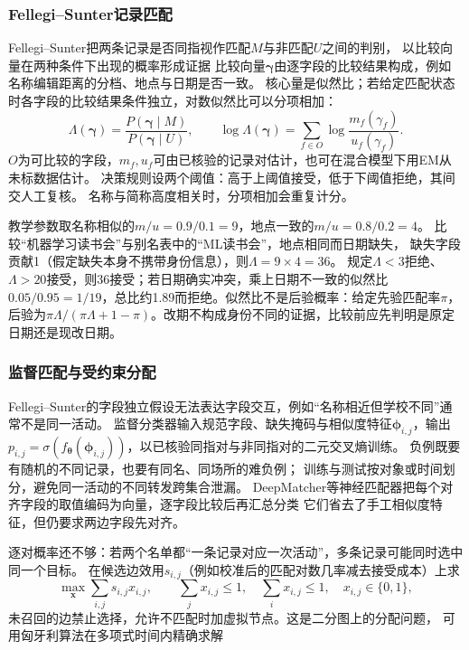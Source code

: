 \subsubsection{Fellegi--Sunter记录匹配}
\label{sec:nlp-extraction-fellegi-sunter}

Fellegi--Sunter把两条记录是否同指视作匹配$M$与非匹配$U$之间的判别，
以比较向量在两种条件下出现的概率形成证据
比较向量$\bm{\gamma}$由逐字段的比较结果构成，例如名称编辑距离的分档、地点与日期是否一致。
核心量是似然比；若给定匹配状态时各字段的比较结果条件独立，对数似然比可以分项相加：
\begin{equation}
  \Lambda(\bm{\gamma})=
  \frac{P(\bm{\gamma}\mid M)}{P(\bm{\gamma}\mid U)},
  \qquad
  \log\Lambda(\bm{\gamma})
    =\sum_{f\in O}
       \log\frac{m_f(\gamma_f)}{u_f(\gamma_f)}.
  \label{eq:nlp-extraction-fellegi}
\end{equation}
$O$为可比较的字段，$m_f,u_f$可由已核验的记录对估计，也可在混合模型下用EM从未标数据估计。
决策规则设两个阈值：高于上阈值接受，低于下阈值拒绝，其间交人工复核。
名称与简称高度相关时，分项相加会重复计分。

教学参数取名称相似的$m/u=0.9/0.1=9$，地点一致的$m/u=0.8/0.2=4$。
比较“机器学习读书会”与别名表中的“ML读书会”，地点相同而日期缺失，
缺失字段贡献1（假定缺失本身不携带身份信息），则$\Lambda=9\times4=36$。
规定$\Lambda<3$拒绝、$\Lambda>20$接受，则36接受；若日期确实冲突，乘上日期不一致的似然比
$0.05/0.95=1/19$，总比约1.89而拒绝。似然比不是后验概率：给定先验匹配率$\pi$，
后验为$\pi\Lambda/(\pi\Lambda+1-\pi)$。改期不构成身份不同的证据，比较前应先判明是原定日期还是现改日期。

\subsubsection{监督匹配与受约束分配}
\label{sec:nlp-extraction-supervised-matching}

Fellegi--Sunter的字段独立假设无法表达字段交互，例如“名称相近但学校不同”通常不是同一活动。
监督分类器输入规范字段、缺失掩码与相似度特征$\bm{\phi}_{i,j}$，输出
$p_{i,j}=\sigma(f_{\bm{\theta}}(\bm{\phi}_{i,j}))$，以已核验同指对与非同指对的二元交叉熵训练。
负例既要有随机的不同记录，也要有同名、同场所的难负例；
训练与测试按对象或时间划分，避免同一活动的不同转发跨集合泄漏。
DeepMatcher等神经匹配器把每个对齐字段的取值编码为向量，逐字段比较后再汇总分类
它们省去了手工相似度特征，但仍要求两边字段先对齐。

逐对概率还不够：若两个名单都“一条记录对应一次活动”，多条记录可能同时选中同一个目标。
在候选边效用$s_{i,j}$（例如校准后的匹配对数几率减去接受成本）上求
\begin{equation}
  \max_{\bm{x}}\sum_{i,j}s_{i,j}x_{i,j},
  \qquad
  \sum_jx_{i,j}\leq1,\quad
  \sum_ix_{i,j}\leq1,\quad
  x_{i,j}\in\{0,1\},
  \label{eq:nlp-extraction-assignment}
\end{equation}
未召回的边禁止选择，允许不匹配时加虚拟节点。这是二分图上的分配问题，
可用匈牙利算法在多项式时间内精确求解

